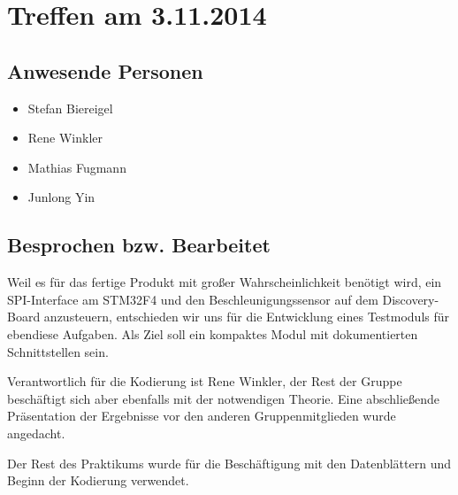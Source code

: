 \chapter{Treffen am 3.11.2014}
\section{Anwesende Personen}
\begin{itemize}
	\item Stefan Biereigel
	\item Rene Winkler
	\item Mathias Fugmann
	\item Junlong Yin
\end{itemize}

\section{Besprochen bzw. Bearbeitet}
Weil es für das fertige Produkt mit großer Wahrscheinlichkeit benötigt wird, ein SPI-Interface am STM32F4 und den Beschleunigungssensor auf dem Discovery-Board anzusteuern, entschieden wir uns für die Entwicklung eines Testmoduls für ebendiese Aufgaben. Als Ziel soll ein kompaktes Modul mit dokumentierten Schnittstellen sein.

Verantwortlich für die Kodierung ist Rene Winkler, der Rest der Gruppe beschäftigt sich aber ebenfalls mit der notwendigen Theorie. Eine abschließende Präsentation der Ergebnisse vor den anderen Gruppenmitglieden wurde angedacht.

Der Rest des Praktikums wurde für die Beschäftigung mit den Datenblättern und Beginn der Kodierung verwendet.